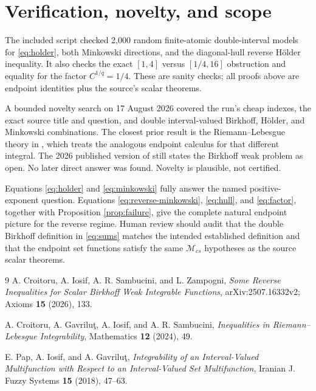\documentclass[10pt]{article}
\begin{document}
\section{Verification, novelty, and scope}

The included script checked 2,000 random finite-atomic double-interval models
for \eqref{eq:holder}, both Minkowski directions, and the diagonal-hull reverse
Hölder inequality.  It also checks the exact $[1,4]$ versus $[1/4,16]$
obstruction and equality for the factor $C^{1/q}=1/4$.  These are sanity
checks; all proofs above are endpoint identities plus the source's scalar
theorems.

A bounded novelty search on 17 August 2026 covered the run's cheap indexes,
the exact source title and question, and double interval-valued Birkhoff,
Hölder, and Minkowski combinations.  The closest prior result is the
Riemann--Lebesgue theory in \cite{CGIS}, which treats the analogous endpoint
calculus for that different integral.  The 2026 published version of
\cite{CISZ} still states the Birkhoff weak problem as open.  No later direct
answer was found.  Novelty is plausible, not certified.

Equations \eqref{eq:holder} and \eqref{eq:minkowski} fully answer the named
positive-exponent question.  Equations \eqref{eq:reverse-minkowski},
\eqref{eq:hull}, and \eqref{eq:factor}, together with Proposition
\ref{prop:failure}, give the complete natural endpoint picture for the reverse
regime.  Human review should audit that the double Birkhoff definition in
\eqref{eq:sums} matches the intended established definition and that the
endpoint set functions satisfy the same $\mathcal M_{cs}$ hypotheses as the
source scalar theorems.

\begin{thebibliography}{9}
A. Croitoru, A. Iosif, A. R. Sambucini, and L. Zampogni,
\emph{Some Reverse Inequalities for Scalar Birkhoff Weak Integrable
Functions}, arXiv:2507.16332v2; Axioms \textbf{15} (2026), 133.

A. Croitoru, A. Gavrilu\c{t}, A. Iosif, and A. R. Sambucini,
\emph{Inequalities in Riemann--Lebesgue Integrability}, Mathematics
\textbf{12} (2024), 49.

E. Pap, A. Iosif, and A. Gavrilu\c{t},
\emph{Integrability of an Interval-Valued Multifunction with Respect to an
Interval-Valued Set Multifunction}, Iranian J. Fuzzy Systems \textbf{15}
(2018), 47--63.
\end{thebibliography}
\end{document}
